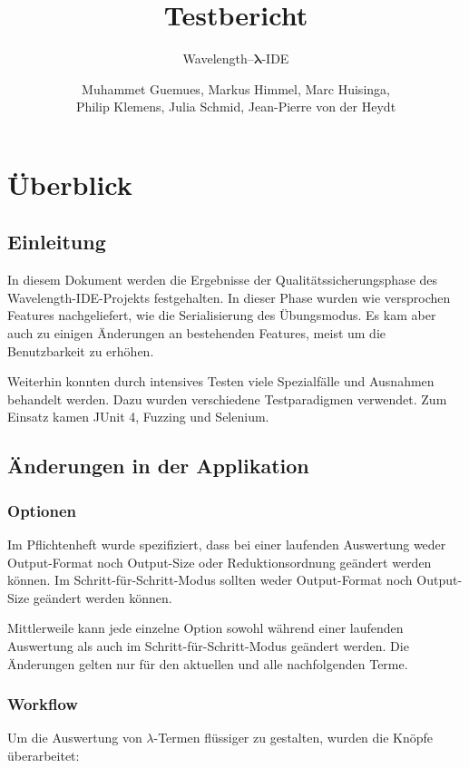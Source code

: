 \documentclass[parskip=full,11pt,openany]{scrreprt}
\title{Testbericht}
\subtitle{Wavelength--$\bm{\lambda}$-IDE}
\author{Muhammet Guemues, Markus Himmel, Marc Huisinga,\\Philip Klemens, Julia Schmid, Jean-Pierre von der Heydt}
\begin{document}
\maketitle
\newpage
\tableofcontents
\newpage

\chapter{Überblick}

\section{Einleitung}

In diesem Dokument werden die Ergebnisse der Qualitätssicherungsphase des Wavelength-IDE-Projekts festgehalten.
In dieser Phase wurden wie versprochen Features nachgeliefert, wie die Serialisierung des Übungsmodus.
Es kam aber auch zu einigen Änderungen an bestehenden Features, meist um die Benutzbarkeit zu erhöhen.

Weiterhin konnten durch intensives Testen viele Spezialfälle und Ausnahmen behandelt werden.
Dazu wurden verschiedene Testparadigmen verwendet.
Zum Einsatz kamen JUnit 4, Fuzzing und Selenium.

\section{Änderungen in der Applikation}
\subsection{Optionen}
Im Pflichtenheft wurde spezifiziert, dass bei einer laufenden Auswertung weder Output-Format noch Output-Size
oder Reduktionsordnung geändert werden können. Im Schritt-für-Schritt-Modus sollten weder Output-Format noch
Output-Size geändert werden können. 

Mittlerweile kann jede einzelne Option sowohl während einer laufenden Auswertung als auch im Schritt-für-Schritt-Modus
geändert werden. Die Änderungen gelten nur für den aktuellen und alle nachfolgenden Terme.

\subsection{Workflow}\label{changeWorkflow}
Um die Auswertung von $\lambda$-Termen flüssiger zu gestalten, wurden die Knöpfe überarbeitet:
\end{document}
